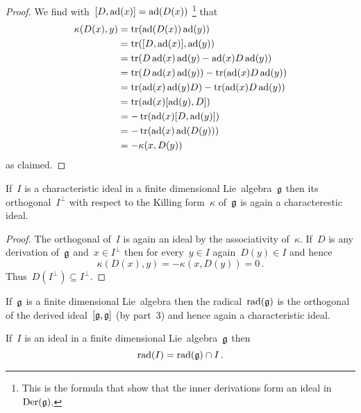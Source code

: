 \begin{proof}
  We find with~$[D, \operatorname{ad}(x)] = \operatorname{ad}(D(x))$%
  \footnote{This is the formula that show that the inner derivations form an ideal in~$\operatorname{Der}(\mathfrak{g})$.}
  that
  \begin{align*}
    \kappa(D(x), y)
    &=
    \operatorname{tr}(\operatorname{ad}(D(x)) \operatorname{ad}(y))
    \\
    &=
    \operatorname{tr}([D, \operatorname{ad}(x)], \operatorname{ad}(y))
    \\
    &=
    \operatorname{tr}(D \operatorname{ad}(x) \operatorname{ad}(y) - \operatorname{ad}(x) D \operatorname{ad}(y))
    \\
    &=
    \operatorname{tr}(D \operatorname{ad}(x) \operatorname{ad}(y)) - \operatorname{tr}(\operatorname{ad}(x) D \operatorname{ad}(y))
    \\
    &=
    \operatorname{tr}(\operatorname{ad}(x) \operatorname{ad}(y) D) - \operatorname{tr}(\operatorname{ad}(x) D \operatorname{ad}(y))
    \\
    &=
    \operatorname{tr}(\operatorname{ad}(x) [\operatorname{ad}(y), D])
    \\
    &=
    -\operatorname{tr}(\operatorname{ad}(x) [D, \operatorname{ad}(y)])
    \\
    &=
    -\operatorname{tr}(\operatorname{ad}(x) \operatorname{ad}(D(y)))
    \\
    &=
    -\kappa(x, D(y))
  \end{align*}
  as claimed.
\end{proof}

\begin{corollary}
  If~$I$ is a characteristic ideal in a finite dimensional Lie~algebra~$\mathfrak{g}$ then its orthogonal~$I^\perp$ with respect to the Killing form~$\kappa$ of~$\mathfrak{g}$ is again a characterestic ideal.
\end{corollary}

\begin{proof}
  The orthogonal of~$I$ is again an ideal by the associativity of~$\kappa$.
  If~$D$ is any derivation of~$\mathfrak{g}$ and~$x \in I^\perp$ then for every~$y \in I$ again~$D(y) \in I$ and hence
  \[
    \kappa(D(x), y)
    =
    -\kappa(x, D(y))
    =
    0 \,.
  \]
  Thus~$D(I^\perp) \subseteq I^\perp$.
\end{proof}

\begin{example}
  \label{radical is characteristic}
  If~$\mathfrak{g}$ is a finite dimensional Lie~algebra then the radical~$\operatorname{rad}(\mathfrak{g})$ is the orthogonal of the derived ideal~$[\mathfrak{g}, \mathfrak{g}]$ (by part~3) and hence again a characteristic ideal.
\end{example}

\begin{corollary}
  \label{radical of ideal}
  If~$I$ is an ideal in a finite dimensional Lie~algebra~$\mathfrak{g}$ then
  \[
    \operatorname{rad}(I)
    =
    \operatorname{rad}(\mathfrak{g}) \cap I  \,.
  \]
\end{corollary}

